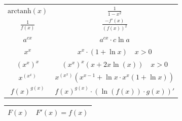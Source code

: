 \begin{center}
\begin{tabular}{c||c}
	        $ \text{arctanh}(x) $ & $ \frac{1}{1 - x^2} $ \\
                $ \frac{1}{f(x)} $ & $ \frac{-f'(x)}{(f(x))^2} $ \\
                $ a^{cx} $ & $ a^{cx} \cdot c \ln a $ \\
                $ x^x $ & $ x^x \cdot (1+\ln x) \quad \scriptstyle x > 0 $ \\
                $ (x^x)^x $ & $ (x^x)^x(x+2x\ln(x)) \quad \scriptstyle x > 0 $ \\
                $ x^{(x^x)} $ & $ x^{(x^x)}(x^{x-1}+\ln x \cdot x^x (1+\ln x)) $ \\
                $ f(x)^{g(x)} $ &  $ f(x)^{g(x)} \cdot (\ln(f(x)) \cdot g(x))' $ \\
        \end{tabular}

        \begin{tabular}{c||c}
                $F(x)$ & $F'(x) = f(x)$ \\
                \hline \hline
                

\end{tabular}
\end{center}
